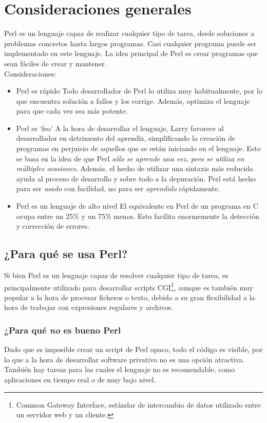 \documentclass[12pt,a4paper]{memoir}
\begin{document}
	\section{Consideraciones generales}
	Perl es un lenguaje capaz de realizar cualquier tipo de tarea, desde soluciones a problemas concretos hasta largos programas. Casi cualquier programa puede ser implementado en este lenguaje. La idea principal de Perl es crear programas que sean fáciles de crear y mantener.\\
	Consideraciones:\\
	\begin{itemize}
	\item Perl es rápido
	\subitem Todo desarrollador de Perl lo utiliza muy habitualmente, por lo que encuentra solución a fallos y los corrige. Además, optimiza el lenguaje para que cada vez sea más potente.
	\item Perl es `feo' 
	\subitem A la hora de desarrollar el lenguaje, Larry favorece al desarrollador en detrimento del aprendiz, simplificando la creación de programas en perjuicio de aquellos que se están iniciando en el lenguaje. Esto se basa en la idea de que Perl \emph{sólo se aprende una vez, pero se utiliza en múltiples ocasiones}. Además, el hecho de utilizar una sintaxis más reducida ayuda al proceso de desarrollo y sobre todo a la depuración. Perl está hecho para ser \textit{usado} con facilidad, no para ser \textit{aprendido} rápidamente.
	\item Perl es un lenguaje de alto nivel
	\subitem El equivalente en Perl de un programa en C ocupa entre un 25\% y un 75\% menos. Esto facilita enormemente la detección y corrección de errores.
	\end{itemize}
	\subsection{¿Para qué se usa Perl?}
	Si bien Perl es un lenguaje capaz de resolver cualquier tipo de tarea, es principalmente utilizado para desarrollar scripts CGI\footnote{Common Gateway Interface, estándar de intercambio de datos utilizado entre un servidor web y un cliente.}, aunque es también muy popular a la hora de procesar ficheros o texto, debido a su gran flexibilidad a la hora de trabajar con expresiones regulares y archivos.
	\subsubsection{¿Para qué \textit{no} es bueno Perl}
	Dado que es imposible crear un script de Perl opaco, todo el código es visible, por lo que a la hora de desarrollar software privativo no es una opción atractiva. También hay tareas para las cuales el lenguaje no es recomendable, como aplicaciones en tiempo real o de muy bajo nivel.
\end{document}
